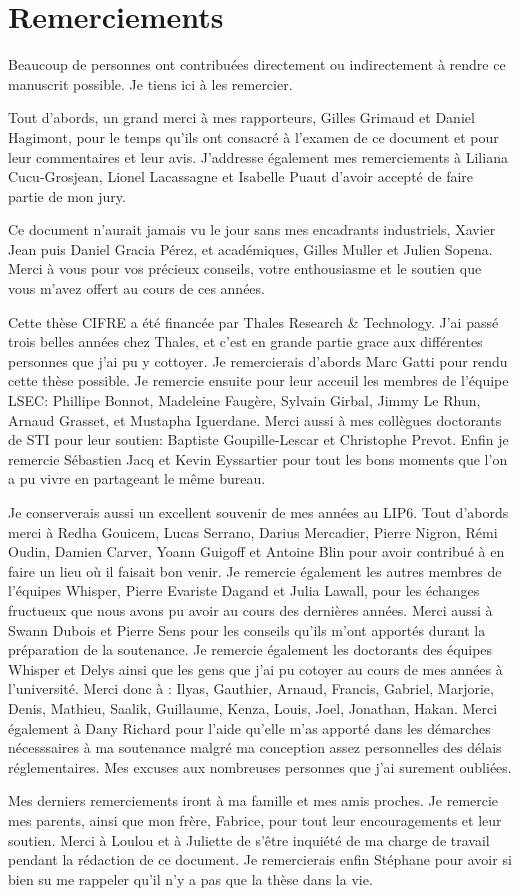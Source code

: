 \chapter*{Remerciements}

Beaucoup de personnes ont contribuées directement ou indirectement à rendre ce manuscrit possible. Je tiens ici à les remercier.

Tout d'abords, un grand merci à mes rapporteurs, Gilles Grimaud et Daniel Hagimont, pour le temps qu'ils ont consacré à l'examen de ce document et pour leur commentaires et leur avis. J'addresse également mes remerciements à Liliana Cucu-Grosjean, Lionel Lacassagne et Isabelle Puaut d'avoir accepté de faire partie de mon jury.

Ce document n'aurait jamais vu le jour sans mes encadrants industriels, Xavier Jean puis Daniel Gracia Pérez, et académiques, Gilles Muller et Julien Sopena.
Merci à vous pour vos précieux conseils, votre enthousiasme et le soutien que vous m'avez offert au cours de ces années.

Cette thèse CIFRE a été financée par Thales Research \& Technology.
J'ai passé trois belles années chez Thales, et c'est en grande partie grace aux différentes personnes que j'ai pu y cottoyer.
Je remercierais d'abords Marc Gatti pour rendu cette thèse possible.
Je remercie ensuite pour leur acceuil les membres de l'équipe LSEC: Phillipe Bonnot, Madeleine Faugère, Sylvain Girbal, Jimmy Le Rhun, Arnaud Grasset, et Mustapha Iguerdane.
Merci aussi à mes collègues doctorants de STI pour leur soutien: Baptiste Goupille-Lescar et Christophe Prevot.
Enfin je remercie Sébastien Jacq et Kevin Eyssartier pour tout les bons moments que l'on a pu vivre en partageant le même bureau.

Je conserverais aussi un excellent souvenir de mes années au LIP6.
Tout d'abords merci à Redha Gouicem, Lucas Serrano, Darius Mercadier, Pierre Nigron, Rémi Oudin, Damien Carver, Yoann Guigoff et Antoine Blin pour avoir contribué à en faire un lieu où il faisait bon venir.
Je remercie également les autres membres de l'équipes Whisper, Pierre Evariste Dagand et Julia Lawall, pour les échanges fructueux que nous avons pu avoir au cours des dernières années.
Merci aussi à Swann Dubois et Pierre Sens pour les conseils qu'ils m'ont apportés durant la préparation de la soutenance.
Je remercie également les doctorants des équipes Whisper et Delys ainsi que les gens que j'ai pu cotoyer au cours de mes années à l'université. Merci donc à : Ilyas, Gauthier, Arnaud, Francis, Gabriel, Marjorie, Denis, Mathieu, Saalik, Guillaume, Kenza, Louis, Joel, Jonathan, Hakan.
Merci également à Dany Richard pour l'aide qu'elle m'as apporté dans les démarches nécesssaires à ma soutenance malgré ma conception assez personnelles des délais réglementaires.
Mes excuses aux nombreuses personnes que j'ai surement oubliées.

Mes derniers remerciements iront à ma famille et mes amis proches.
Je remercie mes parents, ainsi que mon frère, Fabrice, pour tout leur encouragements et leur soutien.
Merci à Loulou et à Juliette de s'être inquiété de ma charge de travail pendant la rédaction de ce document.
Je remercierais enfin Stéphane pour avoir si bien su me rappeler qu'il n'y a pas que la thèse dans la vie.